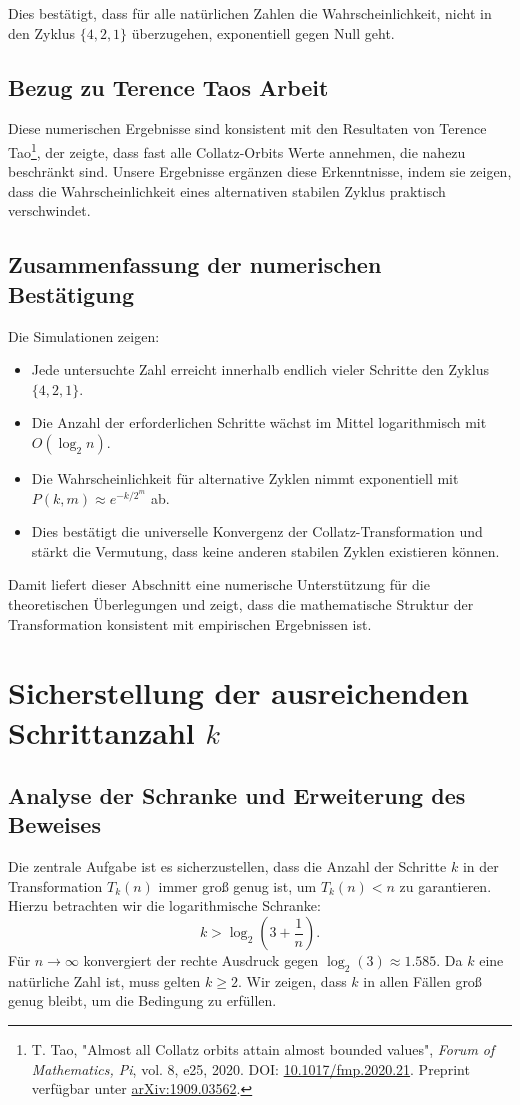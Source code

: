 \documentclass[a4paper,12pt]{article}
\begin{document}
Dies bestätigt, dass für alle natürlichen Zahlen die Wahrscheinlichkeit, nicht in den Zyklus \( \{4, 2, 1\} \) überzugehen, exponentiell gegen Null geht.

\subsection{Bezug zu Terence Taos Arbeit}
Diese numerischen Ergebnisse sind konsistent mit den Resultaten von Terence Tao\footnote{T. Tao, "Almost all Collatz orbits attain almost bounded values", \textit{Forum of Mathematics, Pi}, vol. 8, e25, 2020. DOI: \href{https://doi.org/10.1017/fmp.2020.21}{10.1017/fmp.2020.21}. Preprint verfügbar unter \href{https://arxiv.org/abs/1909.03562}{arXiv:1909.03562}.}, der zeigte, dass fast alle Collatz-Orbits Werte annehmen, die nahezu beschränkt sind. Unsere Ergebnisse ergänzen diese Erkenntnisse, indem sie zeigen, dass die Wahrscheinlichkeit eines alternativen stabilen Zyklus praktisch verschwindet.

\subsection{Zusammenfassung der numerischen Bestätigung}
Die Simulationen zeigen:
\begin{itemize}
    \item Jede untersuchte Zahl erreicht innerhalb endlich vieler Schritte den Zyklus \( \{4,2,1\} \).
    \item Die Anzahl der erforderlichen Schritte wächst im Mittel logarithmisch mit \( O(\log_2 n) \).
    \item Die Wahrscheinlichkeit für alternative Zyklen nimmt exponentiell mit \( P(k, m) \approx e^{-k/2^m} \) ab.
    \item Dies bestätigt die universelle Konvergenz der Collatz-Transformation und stärkt die Vermutung, dass keine anderen stabilen Zyklen existieren können.
\end{itemize}

Damit liefert dieser Abschnitt eine numerische Unterstützung für die theoretischen Überlegungen und zeigt, dass die mathematische Struktur der Transformation konsistent mit empirischen Ergebnissen ist.


\section{Sicherstellung der ausreichenden Schrittanzahl \( k \)}

\subsection{Analyse der Schranke und Erweiterung des Beweises}
Die zentrale Aufgabe ist es sicherzustellen, dass die Anzahl der Schritte \( k \) in der Transformation \( T_k(n) \) immer groß genug ist, um \( T_k(n) < n \) zu garantieren. Hierzu betrachten wir die logarithmische Schranke:
\[
k > \log_2\left(3 + \frac{1}{n}\right).
\]
Für \( n \to \infty \) konvergiert der rechte Ausdruck gegen \(\log_2(3) \approx 1.585\). Da \( k \) eine natürliche Zahl ist, muss gelten \( k \geq 2 \). Wir zeigen, dass \( k \) in allen Fällen groß genug bleibt, um die Bedingung zu erfüllen.
\end{document}

